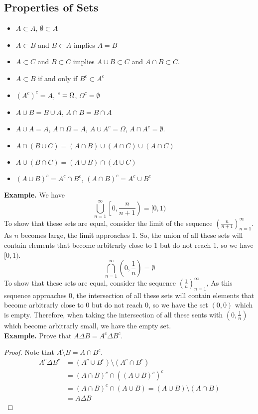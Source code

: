 \documentclass[openany]{report}
\begin{document}
\subsection{Properties of Sets}
\begin{itemize}
    \item $A \subset A$, $\emptyset \subset A$
    \item $A \subset B$ and $B \subset A$ implies $A = B$
    \item $A \subset C$ and $B \subset C$ implies $A \cup B \subset C$ and $A \cap B \subset C$. 
    \item $A \subset B$ if and only if $B^c \subset A^c$
    \item $(A^c)^c = A$, $\empty^c = \Omega$, $\Omega^c = \emptyset$
    \item $A \cup B = B \cup A$, $A \cap B = B \cap A$
    \item $A \cup A = A$, $A \cap \Omega = A$, $A \cup A^c = \Omega$, $A \cap A^c = \emptyset$. 
    \item $A \cap (B \cup C) = (A \cap B) \cup (A \cap C) \cup (A \cap C)$
    \item $A \cup (B \cap C) = (A \cup B) \cap (A \cup C)$
    \item $(A \cup B)^c = A^c \cap B^c$, $(A \cap B)^c = A^c \cup B^c$
\end{itemize}
\textbf{Example.} We have 
\[\bigcup_{n=1}^\infty \left[0, \frac{n}{n+1}\right) = [0,1)\]
To show that these sets are equal, consider the limit of the sequence $\left(\frac{n}{n+1}\right)_{n=1}^\infty$. As $n$ becomes large, the limit approaches 1. So, the union of all these sets will contain elements that become arbitrarly close to 1 but do not reach 1, so we have $[0,1)$.
\[\bigcap_{n=1}^\infty \left(0, \frac{1}{n}\right) = \emptyset\]
To show that these sets are equal, consider the sequence $\left(\frac{1}{n}\right)_{n=1}^\infty$, As this sequence approaches 0, the intersection of all these sets will contain elements that become arbitrarly close to 0 but do not reach 0, so we have the set $(0, 0)$ which is empty. Therefore, when taking the intersection of all these sents with $\left(0, \frac{1}{n}\right)$ which become arbitrarly small, we have the empty set.\\[2ex]
\noindent
\textbf{Example.} Prove that $A \Delta B = A^c \Delta B^c$.
\begin{proof}
    Note that $A \setminus B = A \cap B^c$. 
    \begin{align*}
        A^c \Delta B^c &= (A^c \cup B^c) \setminus (A^c \cap B^c)\\
        &= (A \cap B)^c \cap ((A \cup B)^c)^c\\ 
        &= (A \cap B)^c \cap (A \cup B) = (A \cup B) \setminus (A \cap B) \\
        &= A \Delta B  
    \end{align*}
\end{proof}
\end{document}
